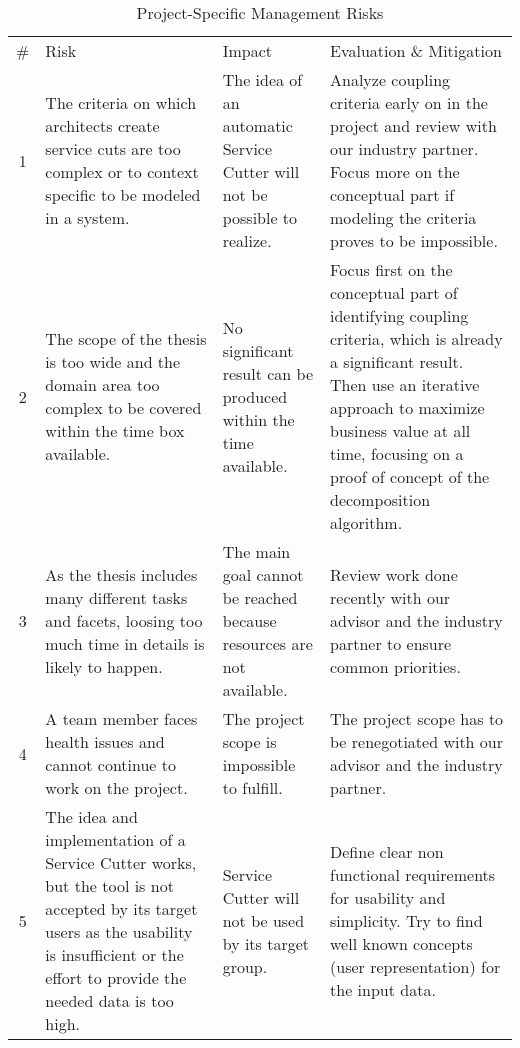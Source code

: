 \begin{table}[H]
\begin{tabular}{|c|p{120pt} p{100pt} p{140pt}|}
\hline \# & Risk & Impact & Evaluation \& Mitigation \\ 
1 & The criteria on which architects create service cuts are too complex or to context specific to be modeled in a system. & The idea of an automatic Service Cutter will not be possible to realize. & Analyze coupling criteria early on in the project and review with our industry partner. Focus more on the conceptual part if modeling the criteria proves to be impossible. \\
2 & The scope of the thesis is too wide and the domain area too complex to be covered within the time box available. & No significant result can be produced within the time available. & Focus first on the conceptual part of identifying coupling criteria, which is already a significant result. Then use an iterative approach to maximize business value at all time, focusing on a proof of concept of the decomposition algorithm. \\
3 & As the thesis includes many different tasks and facets, loosing too much time in details is likely to happen. & The main goal cannot be reached because resources are not available. & Review work done recently with our advisor and the industry partner to ensure common priorities. \\
4 & A team member faces health issues and cannot continue to work on the project. & The project scope is impossible to fulfill. & The project scope has to be renegotiated with our advisor and the industry partner. \\ 
5 & The idea and implementation of a Service Cutter works, but the tool is not accepted by its target users as the usability is insufficient or the effort to provide the needed data is too high. & Service Cutter will not be used by its target group. & Define clear non functional requirements for usability and simplicity. Try to find well known concepts (user representation) for the input data. \\
\hline
\end{tabular}
\caption{Project-Specific Management Risks}
\label{tab:projmgmtrisks}
\end{table}

